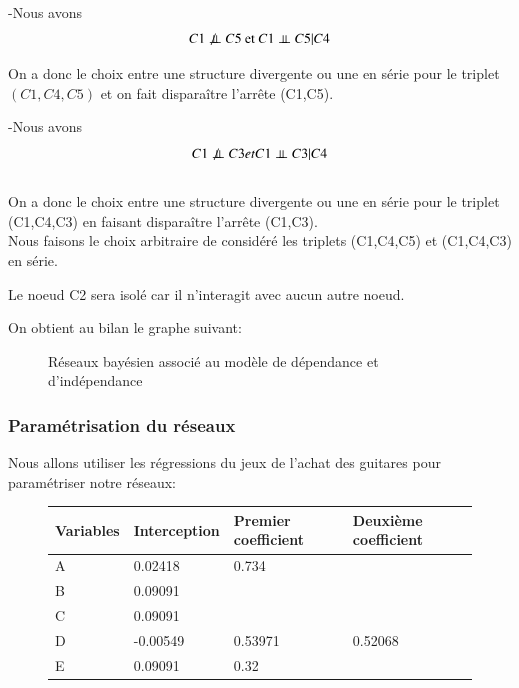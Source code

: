 \documentclass[a4paper]{article}
\begin{document}
\begin{appendices}
\begin{itemize}
-Nous avons $$C1 \not\perp\!\!\!\perp C5 \text{  et  } C1 \perp\!\!\!\perp C5|C4 $$

On a donc le choix entre une structure divergente ou une  en série  pour le triplet $(C1,C4,C5)$ et on fait disparaître l'arrête (C1,C5).

-Nous avons $$C1 \not\perp\!\!\!\perp C3 et C1 \perp\!\!\!\perp C3|C4 $${\\}
On a donc le choix entre une structure divergente ou une  en série  pour le triplet (C1,C4,C3) en faisant disparaître l'arrête (C1,C3).{\\}
Nous faisons  le choix arbitraire de considéré les triplets (C1,C4,C5) et (C1,C4,C3) en série.


Le noeud C2 sera isolé car il n'interagit avec aucun autre noeud.
\end{itemize}

On obtient au bilan le graphe suivant:

\begin{figure}[H] 
    \center 
    \caption{Réseaux bayésien associé au modèle de dépendance et d'indépendance } 
\end{figure}
 
\newpage
\subsubsection{Paramétrisation du réseaux}

Nous allons utiliser les régressions du jeux de l'achat des guitares pour paramétriser notre réseaux:

\begin{figure}[H]
\begin{tabular}{llll}
  \hline
  Variables              & Interception&Premier coefficient& Deuxième coefficient \\
  \hline
A  &0.02418& 0.734&\\
B &0.09091 && \\
C  &0.09091 & & \\
D & -0.00549&0.53971&0.52068\\
E  &0.09091&0.32  & \\
\hline


\end{tabular}
\end{figure}
\end{appendices}
\end{document}
